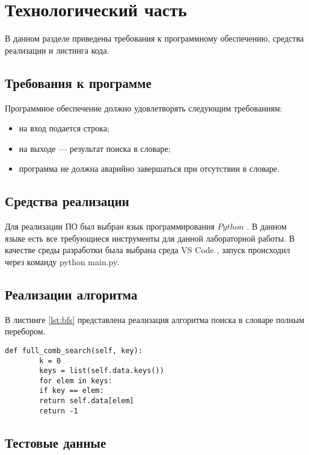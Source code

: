 \chapter{Технологический часть}

В данном разделе приведены требования к программному обеспечению, средства реализации и листинга кода.

\section{Требования к программе}

Программное обеспечение должно удовлетворять следующим требованиям:
\begin{itemize}
	\item на вход подается строка;
	\item на выходе --- результат поиска в словаре;
	\item программа не должна аварийно завершаться при отсутствии в словаре.
\end{itemize}

\section{Средства реализации} 
Для реализации ПО был выбран язык программирования $Python$ \cite{pythonlang}. 
В данном языке есть все требующиеся инструменты для данной лабораторной работы.
В качестве среды разработки была выбрана среда VS Code \cite{vscode}, запуск происходил через команду python main.py.


\section{Реализации алгоритма}
В листинге \ref{lst:bfs} представлена реализация алгоритма поиска в словаре полным перебором.
\clearpage

\begin{center}
	\captionsetup{justification=raggedright,singlelinecheck=off}
	
	\begin{lstlisting}[label=lst:bfs,caption=Реализация алгоритма поиска полным перебором]
		def full_comb_search(self, key):
		k = 0
		keys = list(self.data.keys())
		for elem in keys:
		if key == elem:
		return self.data[elem]
		return -1
	\end{lstlisting}
\end{center}

\section{Тестовые данные}

